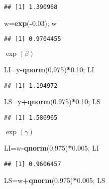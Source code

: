 \documentclass[]{article}
\newenvironment{Shaded}{\begin{snugshade}}{\end{snugshade}}
\newcommand{\FloatTok}[1]{\textcolor[rgb]{0.00,0.00,0.81}{#1}}
\newcommand{\KeywordTok}[1]{\textcolor[rgb]{0.13,0.29,0.53}{\textbf{#1}}}
\newcommand{\NormalTok}[1]{#1}
\newcommand{\OperatorTok}[1]{\textcolor[rgb]{0.81,0.36,0.00}{\textbf{#1}}}
\begin{document}
\begin{verbatim}
## [1] 1.390968
\end{verbatim}

\begin{Shaded}
\begin{Highlighting}[]
\NormalTok{w=}\KeywordTok{exp}\NormalTok{(}\OperatorTok{-}\FloatTok{0.03}\NormalTok{); w}
\end{Highlighting}
\end{Shaded}

\begin{verbatim}
## [1] 0.9704455
\end{verbatim}

\(\exp(\beta)\)

\begin{Shaded}
\begin{Highlighting}[]
\NormalTok{LI=y}\OperatorTok{-}\KeywordTok{qnorm}\NormalTok{(}\FloatTok{0.975}\NormalTok{)}\OperatorTok{*}\FloatTok{0.10}\NormalTok{; LI}
\end{Highlighting}
\end{Shaded}

\begin{verbatim}
## [1] 1.194972
\end{verbatim}

\begin{Shaded}
\begin{Highlighting}[]
\NormalTok{LS=y}\OperatorTok{+}\KeywordTok{qnorm}\NormalTok{(}\FloatTok{0.975}\NormalTok{)}\OperatorTok{*}\FloatTok{0.10}\NormalTok{; LS}
\end{Highlighting}
\end{Shaded}

\begin{verbatim}
## [1] 1.586965
\end{verbatim}

\(\exp(\gamma)\)

\begin{Shaded}
\begin{Highlighting}[]
\NormalTok{LI=w}\OperatorTok{-}\KeywordTok{qnorm}\NormalTok{(}\FloatTok{0.975}\NormalTok{)}\OperatorTok{*}\FloatTok{0.005}\NormalTok{; LI}
\end{Highlighting}
\end{Shaded}

\begin{verbatim}
## [1] 0.9606457
\end{verbatim}

\begin{Shaded}
\begin{Highlighting}[]
\NormalTok{LS=w}\OperatorTok{+}\KeywordTok{qnorm}\NormalTok{(}\FloatTok{0.975}\NormalTok{)}\OperatorTok{*}\FloatTok{0.005}\NormalTok{; LS}
\end{Highlighting}
\end{Shaded}
\end{document}
